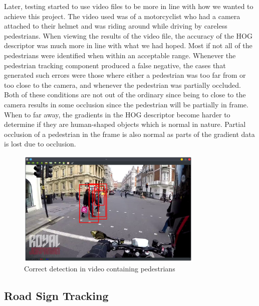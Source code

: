 Later, testing started to use video files to be more in line with how we wanted to achieve this project. The video used was of a motorcyclist who had a camera attached to their helmet and was riding around while driving by careless pedestrians. When viewing the results of the video file, the accuracy of the HOG descriptor was much more in line with what we had hoped. Most if not all of the pedestrians were identified when within an acceptable range. Whenever the pedestrian tracking component produced a false negative, the cases that generated such errors were those where either a pedestrian was too far from or too close to the camera, and whenever the pedestrian was partially occluded. Both of these conditions are not out of the ordinary since being to close to the camera results in some occlusion since the pedestrian will be partially in frame. When to far away, the gradients in the HOG descriptor become harder to determine if they are human-shaped objects which is normal in nature. Partial occlusion of a pedestrian in the frame is also normal as parts of the gradient data is lost due to occlusion.

\begin{figure}
    \centering
    \includegraphics[width=3.5in]{figures/PT_video_correct.png}
    \caption{Correct detection in video containing pedestrians}
\end{figure}

\subsection{Road Sign Tracking}